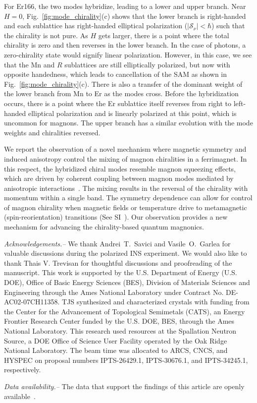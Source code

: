 \documentclass[
amsmath,amssymb,aps,showkeys, nofootinbib, twocolumn,superscriptaddress,longbibliography
]{revtex4-2}
\begin{document}
    For Er166, the two modes hybridize, leading to a lower and upper branch.  Near $H=0$, Fig.~\ref{fig:mode_chirality}(c) shows that the lower branch is right-handed and each sublattice has right-handed elliptical polarization ($|\mathcal{S}_{\nu}| < \hbar$) such that the chirality is not pure.  As $H$ gets larger, there is a point where the total chirality is zero and then reverses in the lower branch.  In the case of photons, a zero-chirality state would signify linear polarization. However, in this case, we see that the Mn and $R$ sublattices are still elliptically polarized, but now with opposite handedness, which leads to cancellation of the SAM as shown in Fig.~\ref{fig:mode_chirality}(c). There is also a transfer of the dominant weight of the lower branch from Mn to Er as the modes cross. Before the hybridization occurs, there is a point where the Er sublattice itself reverses from right to left-handed elliptical polarization and is linearly polarized at this point, which is uncommon for magnons. The upper branch has a similar evolution with the mode weights and chiralities reversed.


    We report the observation of a novel mechanism where magnetic symmetry and induced anisotropy control the mixing of magnon chiralities in a ferrimagnet. In this respect, the hybridized chiral modes resemble magnon squeezing effects, which are driven by coherent coupling between magnon modes mediated by anisotropic interactions~\cite{kam2017,lukas2019,kam2020}. The mixing results in the reversal of the chirality with momentum within a single band. The symmetry dependence can allow for control of magnon chirality when magnetic fields or temperature drive to metamagnetic (spin-reorientation) transitions (See SI~\cite{sup}). Our observation provides a new mechanism for advancing the chirality-based quantum magnonics.


    {\it Acknowledgements.--}
    We thank Andrei~T.~Savici and Vasile~O.~Garlea for valuable discussions during the polarized INS experiment. We would also like to thank Thais V. Trevisan for thoughtful discussions and proofreading of the manuscript. This work is supported by the U.S. Department of Energy (U.S. DOE), Office of Basic Energy Sciences (BES), Division of Materials Sciences and Engineering through the Ames National Laboratory under Contract No. DE-AC02-07CH11358. TJS synthesized and characterized crystals with funding from the Center for the Advancement of Topological Semimetals (CATS), an Energy Frontier Research Center funded by the U.S. DOE, BES, through the Ames National Laboratory. This research used resources at the Spallation Neutron Source, a DOE Office of Science User Facility operated by the Oak Ridge National Laboratory. The beam time was allocated to ARCS, CNCS, and HYSPEC on proposal numbers IPTS-26429.1,  IPTS-30676.1, and IPTS-34245.1, respectively.


    {\it Data availability.--}
    The data that support the findings of this article are openly available~\cite{draj_data}.


\end{document}
